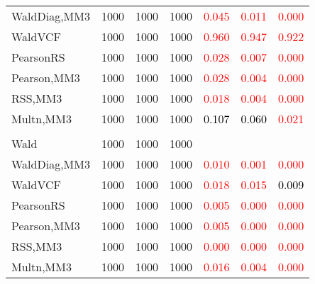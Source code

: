 \documentclass[
]{article}
\begin{document}
\begin{table}[H]
{\begin{tabular}[t]{lrrrrrr}
\hspace{1em}WaldDiag,MM3 & 1000 & 1000 & 1000 & \textcolor{red}{0.045} & \textcolor{red}{0.011} & \textcolor{red}{0.000}\\
\hspace{1em}WaldVCF & 1000 & 1000 & 1000 & \textcolor{red}{0.960} & \textcolor{red}{0.947} & \textcolor{red}{0.922}\\
\hspace{1em}PearsonRS & 1000 & 1000 & 1000 & \textcolor{red}{0.028} & \textcolor{red}{0.007} & \textcolor{red}{0.000}\\
\hspace{1em}Pearson,MM3 & 1000 & 1000 & 1000 & \textcolor{red}{0.028} & \textcolor{red}{0.004} & \textcolor{red}{0.000}\\
\hspace{1em}RSS,MM3 & 1000 & 1000 & 1000 & \textcolor{red}{0.018} & \textcolor{red}{0.004} & \textcolor{red}{0.000}\\
\hspace{1em}Multn,MM3 & 1000 & 1000 & 1000 & \textcolor{black}{0.107} & \textcolor{black}{0.060} & \textcolor{red}{0.021}\\
\addlinespace[0.3em]
\multicolumn{7}{l}{\textbf{3F 15V}}\\
\hspace{1em}Wald & 1000 & 1000 & 1000 & \textcolor{black}{} & \textcolor{black}{} & \textcolor{black}{}\\
\hspace{1em}WaldDiag,MM3 & 1000 & 1000 & 1000 & \textcolor{red}{0.010} & \textcolor{red}{0.001} & \textcolor{red}{0.000}\\
\hspace{1em}WaldVCF & 1000 & 1000 & 1000 & \textcolor{red}{0.018} & \textcolor{red}{0.015} & \textcolor{black}{0.009}\\
\hspace{1em}PearsonRS & 1000 & 1000 & 1000 & \textcolor{red}{0.005} & \textcolor{red}{0.000} & \textcolor{red}{0.000}\\
\hspace{1em}Pearson,MM3 & 1000 & 1000 & 1000 & \textcolor{red}{0.005} & \textcolor{red}{0.000} & \textcolor{red}{0.000}\\
\hspace{1em}RSS,MM3 & 1000 & 1000 & 1000 & \textcolor{red}{0.000} & \textcolor{red}{0.000} & \textcolor{red}{0.000}\\
\hspace{1em}Multn,MM3 & 1000 & 1000 & 1000 & \textcolor{red}{0.016} & \textcolor{red}{0.004} & \textcolor{red}{0.000}\\
\bottomrule
\end{tabular}}
\endgroup{}
\end{table}
\end{document}
